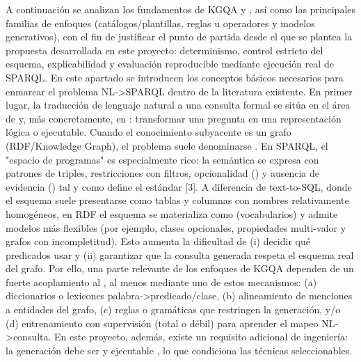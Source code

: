 {}A continuación se analizan los fundamentos de KGQA y , así como las principales familias de enfoques (catálogos/plantillas, reglas u operadores y modelos generativos), con el fin de justificar el punto de partida desde el que se plantea la propuesta desarrollada en este proyecto: determinismo, control estricto del esquema, explicabilidad y evaluación reproducible mediante ejecución real de SPARQL.\markdownRendererInterblockSeparator
{}\markdownRendererInterblockSeparator
{}En este apartado se introducen los conceptos básicos necesarios para enmarcar el problema NL->SPARQL dentro de la literatura existente. En primer lugar, la traducción de lenguaje natural a una consulta formal se sitúa en el área de  y, más concretamente, en : transformar una pregunta en una representación lógica o ejecutable. Cuando el conocimiento subyacente es un grafo (RDF/Knowledge Graph), el problema suele denominarse .\markdownRendererInterblockSeparator
{}En SPARQL, el "espacio de programas" es especialmente rico: la semántica se expresa con patrones de triples, restricciones con filtros, opcionalidad () y ausencia de evidencia () tal y como define el estándar [3]. A diferencia de text-to-SQL, donde el esquema suele presentarse como tablas y columnas con nombres relativamente homogéneos, en RDF el esquema se materializa como  (vocabularios) y admite modelos más flexibles (por ejemplo, clases opcionales, propiedades multi-valor y grafos con incompletitud). Esto aumenta la dificultad de (i) decidir qué predicados usar y (ii) garantizar que la consulta generada respeta el esquema real del grafo.\markdownRendererInterblockSeparator
{}Por ello, una parte relevante de los enfoques de KGQA dependen de un fuerte acoplamiento al , al menos mediante uno de estos mecanismos: (a) diccionarios o lexicones palabra->predicado/clase, (b) alineamiento de menciones a entidades del grafo, (c) reglas o gramáticas que restringen la generación, y/o (d) entrenamiento con supervisión (total o débil) para aprender el mapeo NL->consulta.\markdownRendererInterblockSeparator
{}En este proyecto, además, existe un requisito adicional de ingeniería: la generación debe ser  y ejecutable , lo que condiciona las técnicas seleccionables.\markdownRendererInterblockSeparator
